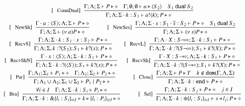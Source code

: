 \begin{figure}[!t]
\[\begin{array}{c}
		\trule{ConnDual}~~\tree{
			\Gamma; \Lambda; \Sigma \proves P \hastype \Proc  \quad \Gamma; \emptyset; \emptyset \proves a \hastype \chtype{S_2} \quad S_1 \dualof S_2
		}{
			\Gamma; \Lambda; \Sigma \cat k: S_1  \proves \bout{a}{k} P \hastype \Proc
		}

		\\[4mm]

		\trule{NewSh}~~\tree{
			\Gamma\cat a:\chtype{S} ; \Lambda; \Sigma \proves P \hastype \Proc
		}{
			\Gamma; \Lambda; \Sigma \proves \news{a} P \hastype \Proc}
		\qquad\quad
		\trule{NewSes}~~\tree{
			\Gamma; \Lambda; \Sigma \cat s:S_1 \cat \dual{s}: S_2 \proves P \hastype \Proc \quad S_1 \dualof S_2
		}{
			\Gamma; \Lambda; \Sigma \proves \news{s} P \hastype \Proc
		}
		\\[4mm]

		\trule{RecvS}~~\tree{
			\Gamma; \Lambda; \Sigma \cat k: S_1 \cat x: S_2 \proves P \hastype \Proc
		}{
			\Gamma; \Lambda; \Sigma, k: \btinp{S_2} S_1  \vdash \binp{k}{x}P \hastype \Proc
		}
		\quad\quad 
		\trule{RecvL}~~\tree{
			\Gamma; \Lambda \cat X: \lhot{S}; \Sigma \cat k: S_1  \proves P \hastype \Proc
		}{
			\Gamma; \Lambda; \Sigma \cat k:\btinp{\lhot{S}}S_1  \proves \binp{k}{X}P \hastype \Proc
		}
		\\[4mm]
		\trule{RecvShN}~~\tree{
			\Gamma \cat x: \chtype{S}; \Lambda; \Sigma \cat k: S_1  \proves P \hastype \Proc
		}{
			\Gamma; \Lambda; \Sigma \cat k:\btinp{\chtype{S}}S_1  \proves \binp{k}{x}P \hastype \Proc
		}
		
		\quad ~~
		\trule{RecvSh}~~\tree{
			\Gamma \cat X: \shot{S}; \Lambda; \Sigma \cat k: S_1  \proves P \hastype \Proc
		}{
			\Gamma; \Lambda; \Sigma \cat k:\btinp{\shot{S}}S_1  \proves \binp{k}{X}P \hastype \Proc
		}
		\\[4mm]
		\trule{Par}~~\tree{
			\Gamma; \Lambda_{1}; \Sigma_{1} \proves P_{1} \hastype \Proc \quad \Gamma; \Lambda_{2}; \Sigma_{2} \proves P_{2} \hastype \Proc
		}{
			\Gamma; \Lambda_{1} \cup \Lambda_2; \Sigma_{1} \cup \Sigma_2 \proves P_1 \Par P_2 \hastype \Proc
		}
		\qquad\quad
		\trule{Close}~~\tree{
			\Gamma; \Lambda; \Sigma  \proves P \hastype T \quad k \not\in \dom{\Gamma, \Lambda,\Sigma}
		}{
			\Gamma; \Lambda; \Sigma \cat k: \tinact  \proves P \hastype \Proc
		}
		\\[4mm]
		\trule{Bra}~~\tree{
			 \forall i \in I \quad \Gamma; \Lambda; \Sigma \cat k:S_i \proves P_i \hastype \Proc
		}{
			\Gamma; \Lambda; \Sigma \cat k: \btbra{l_i:S_i}_{i \in I} \proves \bbra{k}{l_i:P_i}_{i \in I}\hastype \Proc
		}
		\qquad\quad 
	 	\trule{Sel}~~\tree{
			\Gamma; \Lambda; \Sigma \cat k: S_j  \proves P \hastype \Proc \quad j \in I
		}{
			\Gamma; \Lambda; \Sigma \cat k:\btsel{l_i:S_i}_{i \in I} \proves \bsel{s}{l_j} P \hastype \Proc
		}
		\\[4mm]


\end{array}\]
\end{figure}
